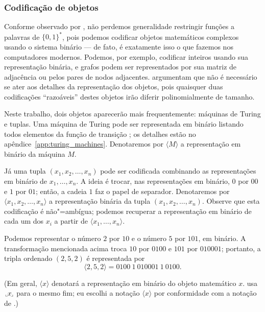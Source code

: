 \subsubsection{Codificação de objetos}
\label{sec:binary_encoding}

Conforme observado por ,
não perdemos generalidade restringir funções a palavras de $\{0, 1\}^*$,
pois podemos codificar objetos matemáticos complexos usando o sistema binário
--- de fato,
é exatamente isso o que fazemos nos computadores modernos.
Podemos, por exemplo,
codificar inteiros usando sua representação binária,
e grafos podem ser representados por sua matriz de adjacência
ou pelos pares de nodos adjacentes.
 argumentam que
não é necessário se ater aos detalhes da representação dos objetos,
pois quaisquer duas codificações ``razoáveis'' destes objetos
irão diferir polinomialmente de tamanho.

Neste trabalho,
dois objetos aparecerão mais frequentemente:
máquinas de Turing e tuplas.
Uma máquina de Turing pode ser representada em binário
listando todos elementos da função de transição
\cite[p.~182]{HopcroftUllman1979};
os detalhes estão no apêndice~\ref{app:turing_machines}.
Denotaremos por $\langle M \rangle$ a representação em binário da máquina $M$.

Já uma tupla $(x_1, x_2, \dots, x_n)$ pode ser codificada
combinando as representações em binário de $x_1, \dots, x_n$.
A ideia é trocar, nas representações em binário,
$0$ por $00$ e $1$ por $01$;
então, a cadeia $1$ faz o papel de separador.
Denotaremos por $\langle x_1, x_2, \dots, x_n \rangle$
a representação binária da tupla $(x_1, x_2, \dots, x_n)$.
Observe que esta codificação é não"=ambígua;
podemos recuperar a representação em binário de cada um dos $x_i$
a partir de $\langle x_1, \dots, x_n \rangle$.

\begin{example}
    Podemos representar o número $2$ por $10$ e o número $5$ por $101$,
    em binário.
    A transformação mencionada acima troca $10$ por $0100$
    e $101$ por $010001$;
    portanto, a tripla ordenado $(2, 5, 2)$ é representada por
    \begin{equation*}
        \langle 2, 5, 2 \rangle = 0100\ 1\ 010001\ 1\ 0100.
    \end{equation*}
\end{example}

(Em geral, $\langle x \rangle$ denotará a representação em binário
do objeto matemático $x$.
 usa
$\sideset{_\llcorner}{_\lrcorner}{\mathop{\makebox[0.5ex]{$x$}}}$
para o mesmo fim;
eu escolhi a notação $\langle x \rangle$
por conformidade com a notação de .)

